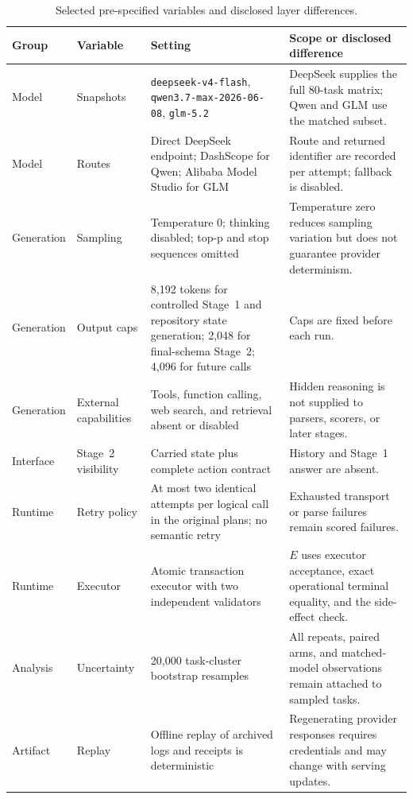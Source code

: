 \documentclass[11pt]{article}
\newcommand{\Eoutcome}{E}
\begin{document}
\begin{table}[h]
\centering
\caption{Selected pre-specified variables and disclosed layer differences.}
\label{tab:variables}
\scriptsize
\begin{tabularx}{\linewidth}{@{}l l Y Y@{}}
\toprule
Group & Variable & Setting & Scope or disclosed difference \\
\midrule
Model & Snapshots & \texttt{deepseek-v4-flash}, \texttt{qwen3.7-max-2026-06-08}, \texttt{glm-5.2} & DeepSeek supplies the full 80-task matrix; Qwen and GLM use the matched subset. \\
Model & Routes & Direct DeepSeek endpoint; DashScope for Qwen; Alibaba Model Studio for GLM & Route and returned identifier are recorded per attempt; fallback is disabled. \\
Generation & Sampling & Temperature 0; thinking disabled; top-p and stop sequences omitted & Temperature zero reduces sampling variation but does not guarantee provider determinism. \\
Generation & Output caps & 8,192 tokens for controlled Stage~1 and repository state generation; 2,048 for final-schema Stage~2; 4,096 for future calls & Caps are fixed before each run. \\
Generation & External capabilities & Tools, function calling, web search, and retrieval absent or disabled & Hidden reasoning is not supplied to parsers, scorers, or later stages. \\
Interface & Stage~2 visibility & Carried state plus complete action contract & History and Stage~1 answer are absent. \\
Runtime & Retry policy & At most two identical attempts per logical call in the original plans; no semantic retry & Exhausted transport or parse failures remain scored failures. \\
Runtime & Executor & Atomic transaction executor with two independent validators & \(\Eoutcome\) uses executor acceptance, exact operational terminal equality, and the side-effect check. \\
Analysis & Uncertainty & 20,000 task-cluster bootstrap resamples & All repeats, paired arms, and matched-model observations remain attached to sampled tasks. \\
Artifact & Replay & Offline replay of archived logs and receipts is deterministic & Regenerating provider responses requires credentials and may change with serving updates. \\
\bottomrule
\end{tabularx}
\end{table}
\end{document}
